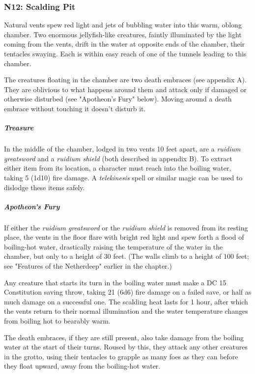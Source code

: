 \documentclass[10pt,a4paper,twoside,fancy,bg=print,twocolumn,openany,nodeprecatedcode]{dndbook}
\begin{document}
\subsubsection{N12: Scalding Pit}
\begin{DndReadAloud}{}
Natural vents spew red light and jets of bubbling water into this warm, oblong chamber. Two enormous jellyfish-like creatures, faintly illuminated by the light coming from the vents, drift in the water at opposite ends of the chamber, their tentacles swaying. Each is within easy reach of one of the tunnels leading to this chamber.

\end{DndReadAloud}

The creatures floating in the chamber are two death embraces (see appendix A). They are oblivious to what happens around them and attack only if damaged or otherwise disturbed (see "Apotheon's Fury" below). Moving around a death embrace without touching it doesn't disturb it.

\subparagraph{Treasure}
In the middle of the chamber, lodged in two vents 10 feet apart, are a \textit{ruidium greatsword} and a \textit{ruidium shield} (both described in appendix B). To extract either item from its location, a character must reach into the boiling water, taking 5 (1d10) fire damage. A \textit{telekinesis} spell or similar magic can be used to dislodge these items safely.

\subparagraph{Apotheon's Fury}
If either the \textit{ruidium greatsword} or the \textit{ruidium shield} is removed from its resting place, the vents in the floor flare with bright red light and spew forth a flood of boiling-hot water, drastically raising the temperature of the water in the chamber, but only to a height of 30 feet. (The walls climb to a height of 100 feet; see "Features of the Netherdeep" earlier in the chapter.)

Any creature that starts its turn in the boiling water must make a DC 15 Constitution saving throw, taking 21 (6d6) fire damage on a failed save, or half as much damage on a successful one. The scalding heat lasts for 1 hour, after which the vents return to their normal illumination and the water temperature changes from boiling hot to bearably warm.

The death embraces, if they are still present, also take damage from the boiling water at the start of their turns. Roused by this, they attack any other creatures in the grotto, using their tentacles to grapple as many foes as they can before they float upward, away from the boiling-hot water.
\end{document}
